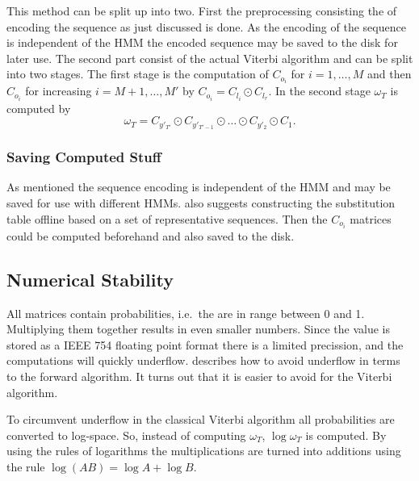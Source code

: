 This method can be split up into two. First the preprocessing consisting the of
encoding the sequence as just discussed is done. As the encoding of the
sequence is independent of the HMM the encoded sequence may be saved to the
disk for later use. The second part consist of the actual Viterbi algorithm
and can be split into two stages. The first stage is the computation of
$C_{o_i}$ for $i = 1, \dots, M$ and then $C_{o_i}$ for increasing
$i = M + 1, \dots, M'$ by $C_{o_i} = C_{l_i} \odot C_{l_r}$. In the second
stage $\omega_T$ is computed by
\begin{equation}
  \label{eq:3}
  \omega_T = C_{y'_{T'}} \odot C_{y'_{T'-1}} \odot \dots \odot C_{y'_2} \odot C_1.
\end{equation}


\subsubsection{Saving Computed Stuff}
\label{sec:saving-comp-stuff}

As mentioned the sequence encoding is independent of the HMM and may be saved
for use with different HMMs. \citet{lifshits2009speeding} also suggests
constructing the substitution table offline based on a set of representative
sequences. Then the $C_{o_i}$ matrices could be computed beforehand and also
saved to the disk.

\subsection{Numerical Stability}
\label{sec:numerical-stability}

All matrices contain probabilities, i.e.\ the are in range between 0 and
1. Multiplying them together results in even smaller numbers. Since the value
is stored as a IEEE 754 floating point format there is a limited precission,
and the computations will quickly underflow. \citet{sand2013ziphmmlib}
describes how to avoid underflow in terms to the forward algorithm. It turns
out that it is easier to avoid for the Viterbi algorithm.

To circumvent underflow in the classical Viterbi algorithm all probabilities
are converted to log-space. So, instead of computing $\omega_T$,
$\log \omega_T$ is computed. By using the rules of logarithms the
multiplications are turned into additions using the rule
$\log(AB) = \log A + \log B$. 


